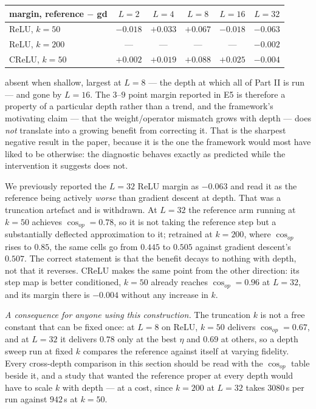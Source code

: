 \documentclass{article} %
\theoremstyle{plain}
\theoremstyle{definition}
\theoremstyle{remark}
\begin{document}
\begin{center}\small
\begin{tabular}{lccccc}
\toprule
margin, reference $-$ gd & $L=2$ & $L=4$ & $L=8$ & $L=16$ & $L=32$ \\
\midrule
ReLU, $k = 50$    & $-0.018$ & $+0.033$ & $\mathbf{+0.067}$ & $-0.018$ & $-0.063$ \\
ReLU, $k = 200$   & ---      & ---      & ---               & ---      & $-0.002$ \\
CReLU, $k = 50$   & $+0.002$ & $+0.019$ & $\mathbf{+0.088}$ & $+0.025$ & $-0.004$ \\
\bottomrule
\end{tabular}
\end{center}

\noindent absent when shallow, largest at $L=8$ --- the depth at which all of Part II is run ---
and gone by $L=16$. The $3$--$9$ point margin reported in E5 is therefore a property of a
particular depth rather than a trend, and the framework's motivating claim --- that the
weight/operator mismatch grows with depth --- does \emph{not} translate into a growing benefit
from correcting it. That is the sharpest negative result in the paper, because it is the one the
framework would most have liked to be otherwise: the diagnostic behaves exactly as predicted while
the intervention it suggests does not.

We previously reported the $L=32$ ReLU margin as $-0.063$ and read it as the reference being
actively \emph{worse} than gradient descent at depth. That was a truncation artefact and is
withdrawn. At $L=32$ the reference arm running at $k=50$ achieves $\cos_{op} = 0.78$, so it is not
taking the reference step but a substantially deflected approximation to it; retrained at
$k = 200$, where $\cos_{op}$ rises to $0.85$, the same cells go from $0.445$ to $0.505$ against
gradient descent's $0.507$. The correct statement is that the benefit decays to nothing with
depth, not that it reverses. CReLU makes the same point from the other direction: its step map is
better conditioned, $k = 50$ already reaches $\cos_{op} = 0.96$ at $L=32$, and its margin there is
$-0.004$ without any increase in $k$.

\emph{A consequence for anyone using this construction.} The truncation $k$ is not a free constant
that can be fixed once: at $L=8$ on ReLU, $k=50$ delivers $\cos_{op} = 0.67$, and at $L=32$ it
delivers $0.78$ only at the best $\eta$ and $0.69$ at others, so a depth sweep run at fixed $k$
compares the reference against itself at varying fidelity. Every cross-depth comparison in this
section should be read with the $\cos_{op}$ table beside it, and a study that wanted the reference
proper at every depth would have to scale $k$ with depth --- at a cost, since $k = 200$ at $L = 32$
takes $3080$\,s per run against $942$\,s at $k = 50$.
\end{document}
